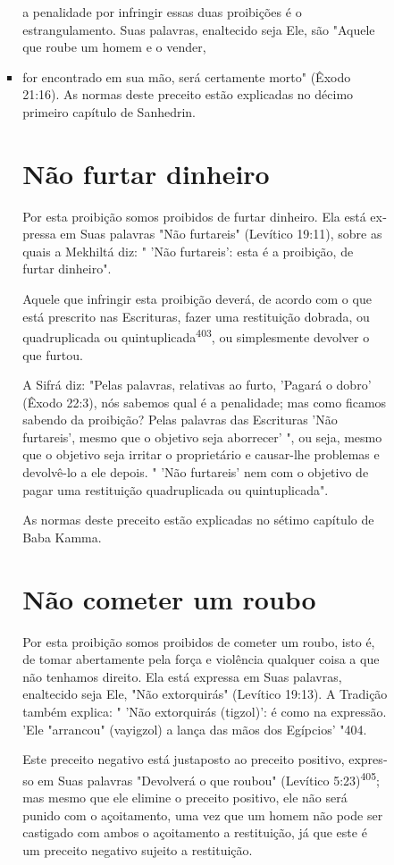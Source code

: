 \begin{itemize}
\begin{enumrate}
\begin{itemize}
\begin{itemize}
\begin{itemize}
 a penalidade por infringir essas duas proibições é o estrangulamento.
 Suas palavras, enaltecido seja Ele, são "Aquele que roube um homem e o
 vender,
 
\item
 
 for encontrado em sua mão, será certamente morto" (Êxodo 21:16). As
 normas deste preceito estão explicadas no décimo primeiro capí­tulo de
 Sanhedrin.



\section{Não furtar dinheiro}

Por esta proibição somos proibidos de furtar dinheiro. Ela está
ex­pressa em Suas palavras "Não furtareis" (Levítico 19:11), sobre as
quais a Mek­hiltá diz: " 'Não furtareis': esta é a proibição, de furtar
dinheiro".

Aquele que infringir esta proibição deverá, de acordo com o que es­tá
prescrito nas Escrituras, fazer uma restituição dobrada, ou
quadruplicada ou quintuplicada\textsuperscript{403}, ou simplesmente
devolver o que furtou.

A Sifrá diz: "Pelas palavras, relativas ao furto, 'Pagará o dobro'
(Êxo­do 22:3), nós sabemos qual é a penalidade; mas como ficamos sabendo
da proi­bição? Pelas palavras das Escrituras 'Não furtareis', mesmo que
o objetivo seja aborrecer' ", ou seja, mesmo que o objetivo seja irritar
o proprietário e causar-lhe problemas e devolvê-lo a ele depois. " 'Não
furtareis' nem com o objetivo de pagar uma restituição quadruplicada ou
quintuplicada".

As normas deste preceito estão explicadas no sétimo capítulo de Ba­ba
Kamma.

\section{Não cometer um roubo}

Por esta proibição somos proibidos de cometer um roubo, isto é, de tomar
abertamente pela força e violência qualquer coisa a que não tenha­mos
direito. Ela está expressa em Suas palavras, enaltecido seja Ele, "Não
ex­torquirás" (Levítico 19:13). A Tradição também explica: " 'Não
extorquirás (tig­zol)': é como na expressão. 'Ele "arrancou" (vayigzol)
a lança das mãos dos Egípcios' "404.

Este preceito negativo está justaposto ao preceito positivo, expres­so
em Suas palavras "Devolverá o que roubou" (Levítico
5:23)\textsuperscript{405}; mas mes­mo que ele elimine o preceito
positivo, ele não será punido com o açoitamen­to, uma vez que um homem
não pode ser castigado com ambos o açoitamento
 a restituição, já que este é um preceito negativo sujeito a
 restituição.



\end{itemize}
\end{itemize}
\end{itemize}
\end{enumrate}
\end{itemize}
